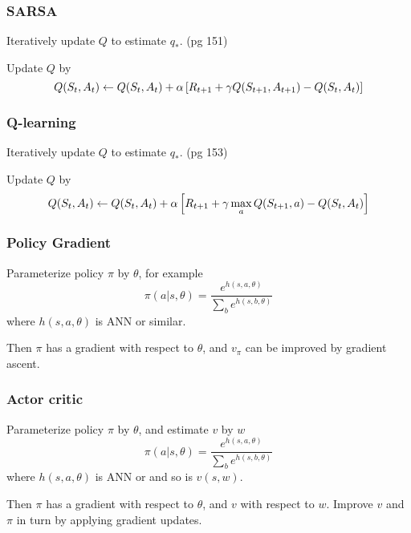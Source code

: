 \documentclass{beamer}
\begin{document}
\frame
{
   \frametitle{SARSA}
   Iteratively update $Q$ to estimate $q_*$. (pg 151)   
   
   Update $Q$ by
   $$Q(S_t,A_t) \leftarrow Q(S_t, A_t) + \alpha \left[{R_{t+1} + \gamma Q(S_{t+1}, A_{t+1}) - Q(S_t,A_t)}\right]$$
}

\frame
{
   \frametitle{Q-learning}
   Iteratively update $Q$ to estimate $q_*$. (pg 153)   
   
   Update $Q$ by
   $$Q(S_t,A_t) \leftarrow Q(S_t, A_t) + \alpha \left[{R_{t+1} + \gamma \max_a Q(S_{t+1}, a) - Q(S_t,A_t)}\right]$$
}

\frame
{
   \frametitle{Policy Gradient}
   Parameterize policy $\pi$ by $\theta$, for example
   $$\pi(a|s, \theta) = \frac{e^{h(s, a, \theta)}}{\sum_b e^{h(s, b, \theta)}}$$
   where $h(s, a, \theta)$ is ANN or similar.

   Then $\pi$ has a gradient with respect to $\theta$, and $v_\pi$ can be 
   improved by gradient ascent.
}

\frame
{
   \frametitle{Actor critic}
   Parameterize policy $\pi$ by $\theta$, and estimate $v$ by $w$
   $$\pi(a|s, \theta) = \frac{e^{h(s, a, \theta)}}{\sum_b e^{h(s, b, \theta)}}$$
   where $h(s, a, \theta)$ is ANN or and so is $v(s, w)$.

   Then $\pi$ has a gradient with respect to $\theta$, and $v$ with respect to
   $w$. Improve $v$ and $\pi$ in turn by applying gradient updates.
}
\end{document}
